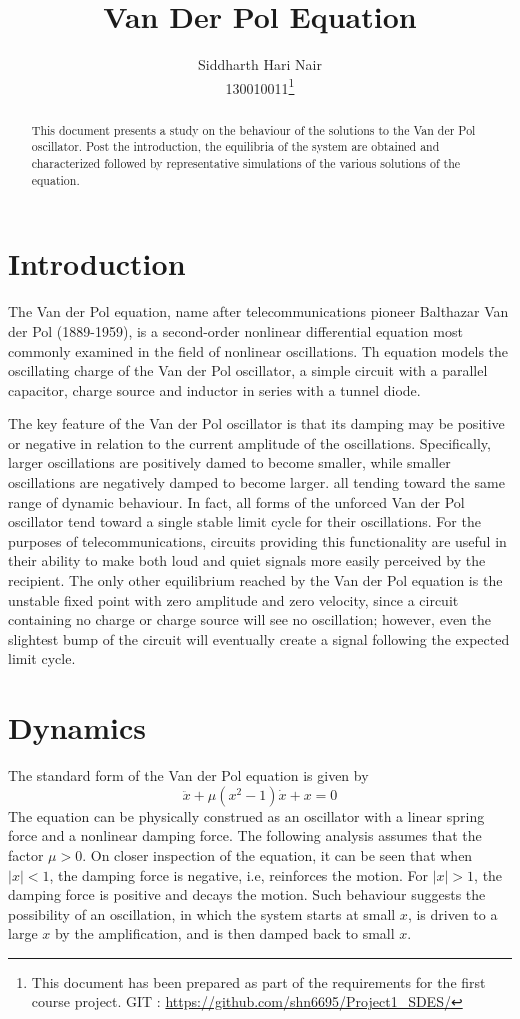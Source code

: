 \documentclass[11pt]{article}
\title{Van Der Pol Equation}
\author{Siddharth Hari Nair\\130010011\thanks{This document has been prepared as part of the requirements for the first course project. GIT : \url{https://github.com/shn6695/Project1_SDES/}}}
\date{}
\begin{document}
\maketitle
\begin{abstract}
This document presents a study on the behaviour of the solutions to the Van der Pol oscillator. Post the introduction, the equilibria of the system are obtained and characterized followed by representative simulations of the various solutions of the equation.
\end{abstract}
\section{Introduction}
The Van der Pol equation, name after telecommunications pioneer Balthazar Van der Pol (1889-1959), is a second-order nonlinear differential equation most commonly examined in the field of nonlinear oscillations. Th equation models the oscillating charge of the Van der Pol oscillator, a simple circuit with a parallel capacitor, charge source and inductor in series with a tunnel diode.
\par
The key feature  of the Van der Pol oscillator is that its damping may be positive or negative in relation to the current amplitude of the oscillations. Specifically, larger oscillations are positively damed to become smaller, while smaller oscillations are negatively damped to become larger. all tending toward the same range of dynamic behaviour. In fact, all forms of the unforced Van der Pol oscillator tend toward a single stable limit cycle for their oscillations. For the purposes of telecommunications, circuits providing this functionality are useful in their ability to make both loud and quiet signals more easily perceived by the recipient. The only other equilibrium reached by the Van der Pol equation is the unstable  fixed point with zero amplitude and zero velocity, since a circuit containing no charge or charge source will see no oscillation; however, even the slightest bump of the circuit will eventually create a signal following the expected limit cycle.
\section{Dynamics}
The standard form of the Van der Pol equation is given by
\begin{equation}\label{vdp}
\ddot{x}+\mu(x^2-1)\dot{x}+x=0
\end{equation}
The equation can be physically construed as an oscillator with a linear spring force and a nonlinear damping force. The following analysis assumes that the factor $\mu >0$. On closer inspection of the equation, it can be seen that when $|x| <1$, the damping force is negative, i.e, reinforces the motion. For $|x| >1$, the damping force is positive and decays the motion. Such behaviour suggests the possibility of an oscillation, in which the system starts at small $x$, is driven to a large $x$ by the amplification, and is then damped back to small $x$.
\end{document}
